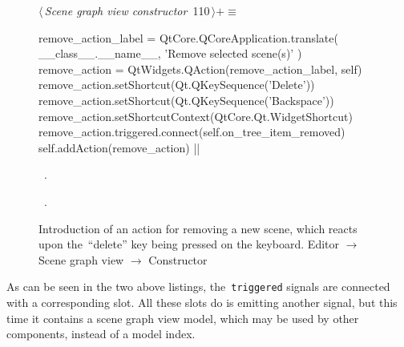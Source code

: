 \documentclass[%
    a4paper,    %
    justified,  %
    nobib,      %
    openany     %
]{tufte-book}
\makeatletter
\renewcommand{\label}[1]{\@tufte@label{##1}}%
\makeatother
\begin{document}
\begin{figure}[!htbp]
\begin{flushleft} \small
\begin{minipage}{\linewidth}\label{scrap47}\raggedright\small
{} $\langle\,${\itshape Scene graph view constructor}\nobreak\ {\footnotesize {110}}$\,\rangle+\equiv$
\vspace{-1ex}
\begin{pythoncode}
    remove_action_label = QtCore.QCoreApplication.translate(
        __class__.__name__, 'Remove selected scene(s)'
    )
    remove_action = QtWidgets.QAction(remove_action_label, self)
    remove_action.setShortcut(Qt.QKeySequence('Delete'))
    remove_action.setShortcut(Qt.QKeySequence('Backspace'))
    remove_action.setShortcutContext(QtCore.Qt.WidgetShortcut)
    remove_action.triggered.connect(self.on_tree_item_removed)
    self.addAction(remove_action)
|\NWsep|
\end{pythoncode}
\vspace{1.5ex}
\footnotesize
\begin{list}{}{\setlength{\itemsep}{-\parsep}\setlength{\itemindent}{-\leftmargin}}
\item \NWtxtMacroDefBy\ .
\item \NWtxtMacroRefIn\ .

\item{}
\end{list}
\end{minipage}\vspace{4ex}
\end{flushleft}
\caption{Introduction of an action for removing a new scene, which reacts upon
  the~\enquote{delete} key being pressed on the keyboard.
  \newline{}\newline{}Editor $\rightarrow$ Scene graph view
  $\rightarrow$ Constructor}
\end{figure}

As can be seen in the two above listings, the~\verb=triggered= signals are
connected with a corresponding slot. All these slots do is emitting another
signal, but this time it contains a scene graph view model, which may be used by
other components, instead of a model index.
\end{document}
